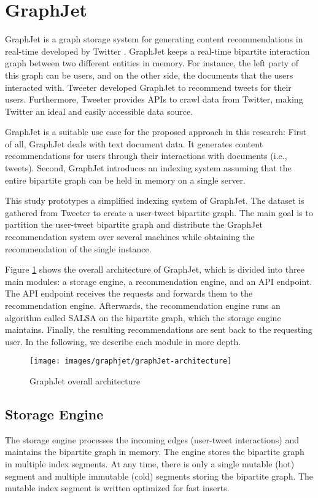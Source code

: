 \section{GraphJet}
\label{sec:GraphJet}
GraphJet is a graph storage system for generating content recommendations in real-time developed by Twitter \cite{sharmaGraphJetRealtimeContent2016}. GraphJet keeps a real-time bipartite interaction graph between two different entities in memory. For instance, the left party of this graph can be users, and on the other side, the documents that the users interacted with. Tweeter developed GraphJet to recommend tweets for their users. Furthermore, Tweeter provides APIs to crawl data from Twitter, making Twitter an ideal and easily accessible data source.


GraphJet is a suitable use case for the proposed approach in this research: First of all, GraphJet deals with text document data. It generates content recommendations for users through their interactions with documents (i.e., tweets). Second, GraphJet introduces an indexing system assuming that the entire bipartite graph can be held in memory on a single server.


This study prototypes a simplified indexing system of GraphJet. The dataset is gathered from Tweeter to create a user-tweet bipartite graph. The main goal is to partition the user-tweet bipartite graph and distribute the GraphJet recommendation system over several machines while obtaining the recommendation of the single instance.


Figure \ref{fig:graphJet-architecture} shows the overall architecture of GraphJet, which is divided into three main modules: a storage engine, a recommendation engine, and an API endpoint. The API endpoint receives the requests and forwards them to the recommendation engine. Afterwards, the recommendation engine runs an algorithm called SALSA \cite{lempelSALSAStochasticApproach2001} on the bipartite graph, which the storage engine maintains. Finally, the resulting recommendations are sent back to the requesting user. In the following, we describe each module in more depth. 

\begin{figure}[!htb]
    \centering
    \texttt{[image: images/graphjet/graphJet-architecture]}
    \caption{GraphJet overall architecture \cite{sharmaGraphJetRealtimeContent2016}}
    \label{fig:graphJet-architecture}
\end{figure}


\subsection{Storage Engine}
\label{subsec:GraphJet-Storage-Engine}
The storage engine processes the incoming edges (user-tweet interactions) and maintains the bipartite graph in memory. The engine stores the bipartite graph in multiple index segments. At any time, there is only a single mutable (hot) segment and multiple immutable (cold) segments storing the bipartite graph. The mutable index segment is written optimized for fast inserts. 

